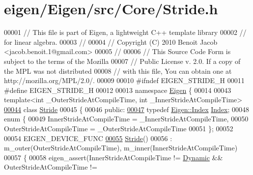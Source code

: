 \hypertarget{eigen_2_eigen_2src_2_core_2_stride_8h_source}{}\section{eigen/\+Eigen/src/\+Core/\+Stride.h}
\label{eigen_2_eigen_2src_2_core_2_stride_8h_source}

\begin{DoxyCode}
00001 \textcolor{comment}{// This file is part of Eigen, a lightweight C++ template library}
00002 \textcolor{comment}{// for linear algebra.}
00003 \textcolor{comment}{//}
00004 \textcolor{comment}{// Copyright (C) 2010 Benoit Jacob <jacob.benoit.1@gmail.com>}
00005 \textcolor{comment}{//}
00006 \textcolor{comment}{// This Source Code Form is subject to the terms of the Mozilla}
00007 \textcolor{comment}{// Public License v. 2.0. If a copy of the MPL was not distributed}
00008 \textcolor{comment}{// with this file, You can obtain one at http://mozilla.org/MPL/2.0/.}
00009 
00010 \textcolor{preprocessor}{#ifndef EIGEN\_STRIDE\_H}
00011 \textcolor{preprocessor}{#define EIGEN\_STRIDE\_H}
00012 
00013 \textcolor{keyword}{namespace }\hyperlink{namespace_eigen}{Eigen} \{ 
00014 
00043 \textcolor{keyword}{template}<\textcolor{keywordtype}{int} \_OuterStr\textcolor{keywordtype}{id}eAtCompileTime, \textcolor{keywordtype}{int} \_InnerStr\textcolor{keywordtype}{id}eAtCompileTime>
\hyperlink{group___core___module}{00044} \textcolor{keyword}{class }\hyperlink{group___core___module_class_eigen_1_1_stride}{Stride}
00045 \{
00046   \textcolor{keyword}{public}:
\hyperlink{group___core___module_a96c2dfb0ce43fd8e19adcdf6094f5f63}{00047}     \textcolor{keyword}{typedef} \hyperlink{namespace_eigen_a62e77e0933482dafde8fe197d9a2cfde}{Eigen::Index} \hyperlink{group___core___module_a96c2dfb0ce43fd8e19adcdf6094f5f63}{Index}; 
00048     \textcolor{keyword}{enum} \{
00049       InnerStrideAtCompileTime = \_InnerStrideAtCompileTime,
00050       OuterStrideAtCompileTime = \_OuterStrideAtCompileTime
00051     \};
00052 
00054     EIGEN\_DEVICE\_FUNC
\hyperlink{group___core___module_a8c5d1654633a1ce2c655a0e94ee975f0}{00055}     \hyperlink{group___core___module_a8c5d1654633a1ce2c655a0e94ee975f0}{Stride}()
00056       : m\_outer(OuterStrideAtCompileTime), m\_inner(InnerStrideAtCompileTime)
00057     \{
00058       eigen\_assert(InnerStrideAtCompileTime != \hyperlink{namespace_eigen_ad81fa7195215a0ce30017dfac309f0b2}{Dynamic} && OuterStrideAtCompileTime != 

\end{DoxyCode}
